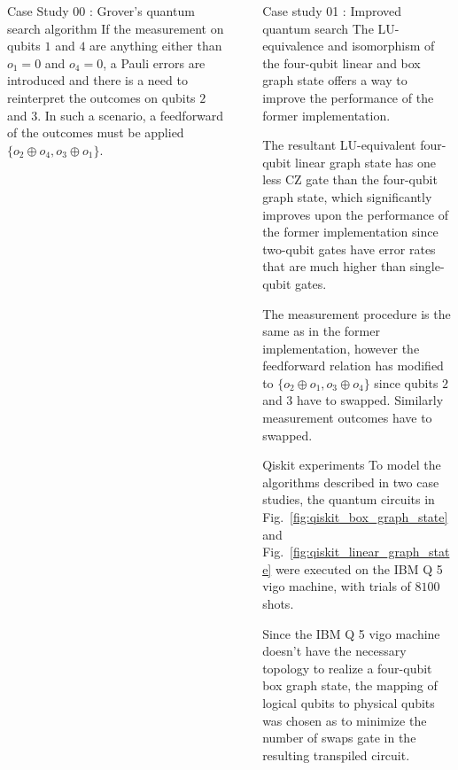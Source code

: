 \documentclass[final]{beamer}
\newlength{\sepwidth}
\newlength{\colwidth}
\newcommand{\separatorcolumn}{\begin{column}{\sepwidth}\end{column}}
\begin{document}
\begin{frame}[t]
\begin{columns}[t]
\begin{column}{\colwidth}
\begin{block}{Case Study 00 : Grover's quantum search algorithm}
                    If the measurement on qubits $1$ and $4$ are anything either
                    than $o_1= 0$ and $o_4= 0$, a Pauli errors are introduced and there
                    is a need to reinterpret the outcomes on qubits $2$ and $3$. In such a scenario, a
                    feedforward of the outcomes must be applied $\{o_2 \oplus o_4, o_3 \oplus o_ 1\}$.
                \end{block}
            \end{column}

            \separatorcolumn

            \begin{column}{\colwidth}
                \begin{block}{Case study 01 : Improved quantum search}
                    The LU-equivalence and isomorphism of the four-qubit linear and box
                    graph state offers a way to improve the performance of the
                    former implementation.

                    The resultant LU-equivalent four-qubit
                    linear graph state has one less $\text{CZ}$ gate than the
                    four-qubit graph state, which significantly improves upon
                    the performance of the former implementation since two-qubit
                    gates have error rates that are much higher than
                    single-qubit gates.

                    The measurement procedure is the same as in the former
                    implementation, however the feedforward relation has
                    modified to $\{o_2 \oplus o_1, o_3 \oplus o_4 \}$ since
                    qubits $2$ and $3$ have to swapped. Similarly measurement outcomes have
                    to swapped.

                \end{block}
                \begin{block}{Qiskit experiments}
                    To model the algorithms described in two case studies, the
                    quantum circuits in Fig.~\ref{fig:qiskit_box_graph_state}
                    and Fig.~\ref{fig:qiskit_linear_graph_state} were executed on the
                    IBM Q 5 vigo machine, with trials of $8100$ shots.

                    Since the IBM Q 5 vigo machine doesn't have the necessary
                    topology to realize a four-qubit box graph state, the
                    mapping of logical qubits to physical qubits was chosen as to minimize the
                    number of swaps gate in the resulting transpiled circuit.


\end{block}
\end{column}
\end{columns}
\end{frame}
\end{document}
